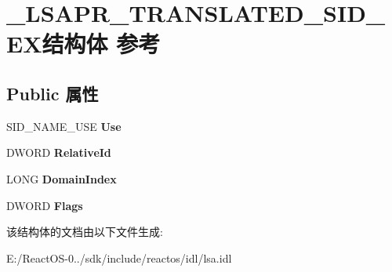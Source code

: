 \hypertarget{struct___l_s_a_p_r___t_r_a_n_s_l_a_t_e_d___s_i_d___e_x}{}\section{\+\_\+\+L\+S\+A\+P\+R\+\_\+\+T\+R\+A\+N\+S\+L\+A\+T\+E\+D\+\_\+\+S\+I\+D\+\_\+\+E\+X结构体 参考}
\label{struct___l_s_a_p_r___t_r_a_n_s_l_a_t_e_d___s_i_d___e_x}
\subsection*{Public 属性}
\begin{DoxyCompactItemize}
\item 
\mbox{\label{struct___l_s_a_p_r___t_r_a_n_s_l_a_t_e_d___s_i_d___e_x_a6f328e652a7b1dd04a7c6f9889e93df5}} 
S\+I\+D\+\_\+\+N\+A\+M\+E\+\_\+\+U\+SE {\bfseries Use}
\item 
\mbox{\label{struct___l_s_a_p_r___t_r_a_n_s_l_a_t_e_d___s_i_d___e_x_a50a8da2e4d23a529284a27155f0aa7f0}} 
D\+W\+O\+RD {\bfseries Relative\+Id}
\item 
\mbox{\label{struct___l_s_a_p_r___t_r_a_n_s_l_a_t_e_d___s_i_d___e_x_a1f98f69c3ea501b0714ca9af2dad5a5c}} 
L\+O\+NG {\bfseries Domain\+Index}
\item 
\mbox{\label{struct___l_s_a_p_r___t_r_a_n_s_l_a_t_e_d___s_i_d___e_x_a809d253b070a77b1d76350db9a6f3e6e}} 
D\+W\+O\+RD {\bfseries Flags}
\end{DoxyCompactItemize}


该结构体的文档由以下文件生成\+:\begin{DoxyCompactItemize}
\item 
E\+:/\+React\+O\+S-\/0../sdk/include/reactos/idl/lsa.\+idl\end{DoxyCompactItemize}
